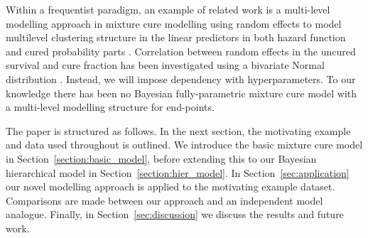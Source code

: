 \documentclass[AMA,STIX1COL]{WileyNJD-v2}
\begin{document}
Within a frequentist paradigm, an example of related work is a multi-level modelling approach in mixture cure modelling using random effects to model multilevel clustering structure in the linear predictors in both hazard function and cured probability parts \cite{Lai2009}.
Correlation between random effects in the uncured survival and cure fraction has been investigated using a bivariate Normal distribution \cite{Lai2008} \cite{Tan2018}.
Instead, we will impose dependency with hyperparameters.
To our knowledge there has been no Bayesian fully-parametric mixture cure model with a multi-level modelling structure for end-points.

The paper is structured as follows.
In the next section, the motivating example and data used throughout is outlined.
We introduce the basic mixture cure model in Section~\ref{section:basic_model}, before extending this to our Bayesian hierarchical model in Section~\ref{section:hier_model}.
In Section~\ref{sec:application} our novel modelling approach is applied to the motivating example dataset.
Comparisons are made between our approach and an independent model analogue.
Finally, in Section~\ref{sec:discussion} we discuss the results and future work.

%
\end{document}
